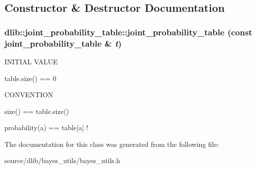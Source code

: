 \subsection{Constructor \& Destructor Documentation}
\hypertarget{classdlib_1_1joint__probability__table_a68ba392924a2080a56d0246b7b01b7a2}{
\subsubsection[{joint\_\-probability\_\-table}]{\setlength{\rightskip}{0pt plus 5cm}dlib::joint\_\-probability\_\-table::joint\_\-probability\_\-table (const {\bf joint\_\-probability\_\-table} \& {\em t})}}
\label{classdlib_1_1joint__probability__table_a68ba392924a2080a56d0246b7b01b7a2}
INITIAL VALUE
\begin{DoxyItemize}
\item table.size() == 0
\end{DoxyItemize}

CONVENTION
\begin{DoxyItemize}
\item size() == table.size()
\item probability(a) == table\mbox{[}a\mbox{]} ! 
\end{DoxyItemize}

The documentation for this class was generated from the following file:\begin{DoxyCompactItemize}
\item 
source/dlib/bayes\_\-utils/bayes\_\-utils.h\end{DoxyCompactItemize}
